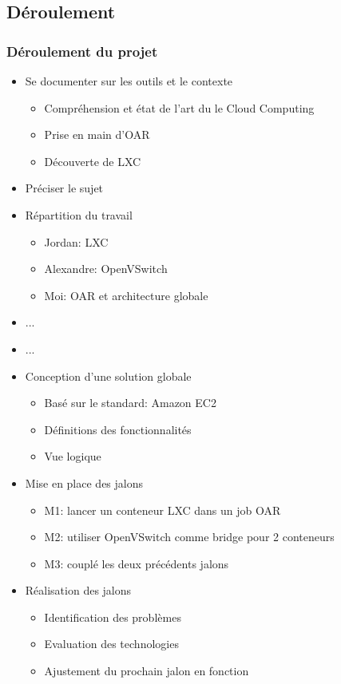\documentclass{beamer}
\begin{document}
		\subsection{Déroulement}
			\begin{frame}
			  \frametitle{Déroulement du projet}
			  \begin{itemize}
			    \item Se documenter sur les outils et le contexte
			    \begin{itemize}
			      \item Compréhension et état de l'art du le Cloud Computing
			      \item Prise en main d'OAR
			      \item Découverte de LXC
			    \end{itemize}
			    \item Préciser le sujet
			    \item Répartition du travail
			    \begin{itemize}
			      \item Jordan: LXC
            \item Alexandre: OpenVSwitch
            \item Moi: OAR et architecture globale
			    \end{itemize}
			    \item ...
			  \end{itemize}
			\end{frame}
			\begin{frame}
			  \begin{itemize}
			    \item ...
			    \item Conception d'une solution globale
			    \begin{itemize}
			      \item Basé sur le standard: Amazon EC2
            \item Définitions des fonctionnalités
            \item Vue logique
			    \end{itemize}
			    \item Mise en place des jalons
			    \begin{itemize}
			      \item M1: lancer un conteneur LXC dans un job OAR
            \item M2: utiliser OpenVSwitch comme bridge pour 2 conteneurs
            \item M3: couplé les deux précédents jalons
			    \end{itemize}
			    \item Réalisation des jalons
			    \begin{itemize}
			      \item Identification des problèmes
            \item Evaluation des technologies
            \item Ajustement du prochain jalon en fonction
			    \end{itemize}
			  \end{itemize}
			\end{frame}
			
\end{document}
